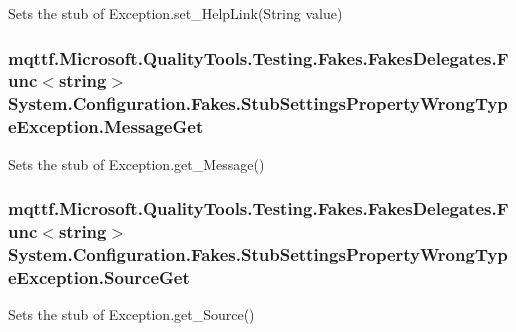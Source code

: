 Sets the stub of Exception.\-set\-\_\-\-Help\-Link(\-String value)

\hypertarget{class_system_1_1_configuration_1_1_fakes_1_1_stub_settings_property_wrong_type_exception_a4e8621f6b35dbf5f531911583d61731c}{
\subsubsection[{Message\-Get}]{\setlength{\rightskip}{0pt plus 5cm}mqttf.\-Microsoft.\-Quality\-Tools.\-Testing.\-Fakes.\-Fakes\-Delegates.\-Func$<$string$>$ System.\-Configuration.\-Fakes.\-Stub\-Settings\-Property\-Wrong\-Type\-Exception.\-Message\-Get}}\label{class_system_1_1_configuration_1_1_fakes_1_1_stub_settings_property_wrong_type_exception_a4e8621f6b35dbf5f531911583d61731c}


Sets the stub of Exception.\-get\-\_\-\-Message()

\hypertarget{class_system_1_1_configuration_1_1_fakes_1_1_stub_settings_property_wrong_type_exception_a3aeb51cfa98eba2dfba4aedbc7681186}{
\subsubsection[{Source\-Get}]{\setlength{\rightskip}{0pt plus 5cm}mqttf.\-Microsoft.\-Quality\-Tools.\-Testing.\-Fakes.\-Fakes\-Delegates.\-Func$<$string$>$ System.\-Configuration.\-Fakes.\-Stub\-Settings\-Property\-Wrong\-Type\-Exception.\-Source\-Get}}\label{class_system_1_1_configuration_1_1_fakes_1_1_stub_settings_property_wrong_type_exception_a3aeb51cfa98eba2dfba4aedbc7681186}


Sets the stub of Exception.\-get\-\_\-\-Source()

